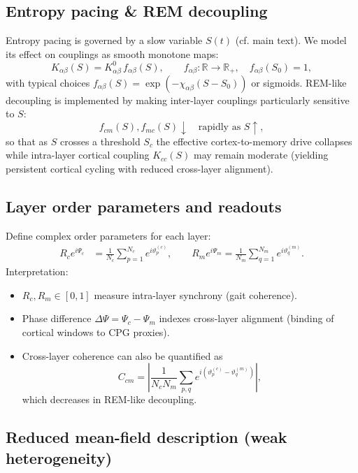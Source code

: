 \documentclass{article}
\begin{document}
\subsection{Entropy pacing \& REM decoupling}

Entropy pacing is governed by a slow variable $S(t)$ (cf. main text). We model its effect on couplings as smooth monotone maps:
\begin{equation}
K_{\alpha\beta}(S) = K_{\alpha\beta}^0 \, f_{\alpha\beta}(S),\qquad
f_{\alpha\beta}:\mathbb{R}\to\mathbb{R}_+, \quad f_{\alpha\beta}(S_0)=1,
\end{equation}
with typical choices $f_{\alpha\beta}(S)=\exp(-\chi_{\alpha\beta} (S-S_0))$ or sigmoids. REM-like decoupling is implemented by making inter-layer couplings particularly sensitive to $S$:
\[
f_{cm}(S), f_{mc}(S) \downarrow \quad \text{rapidly as } S \uparrow,
\]
so that as $S$ crosses a threshold $S_c$ the effective cortex-to-memory drive collapses while intra-layer cortical coupling $K_{cc}(S)$ may remain moderate (yielding persistent cortical cycling with reduced cross-layer alignment).

\subsection{Layer order parameters and readouts}

Define complex order parameters for each layer:
\begin{align}
R_c e^{i\Psi_c} &= \frac{1}{N_c}\sum_{p=1}^{N_c} e^{i\vartheta_p^{(c)}},\qquad
R_m e^{i\Psi_m} = \frac{1}{N_m}\sum_{q=1}^{N_m} e^{i\vartheta_q^{(m)}}.
\end{align}
Interpretation:
\begin{itemize}
  \item $R_c,R_m\in[0,1]$ measure intra-layer synchrony (gait coherence).
  \item Phase difference $\Delta\Psi=\Psi_c-\Psi_m$ indexes cross-layer alignment (binding of cortical windows to CPG proxies).
  \item Cross-layer coherence can also be quantified as
  \[
  C_{cm} = \left|\frac{1}{N_c N_m}\sum_{p,q} e^{i(\vartheta_p^{(c)}-\vartheta_q^{(m)})}\right|,
  \]
  which decreases in REM-like decoupling.
\end{itemize}

\subsection{Reduced mean-field description (weak heterogeneity)}
\end{document}
